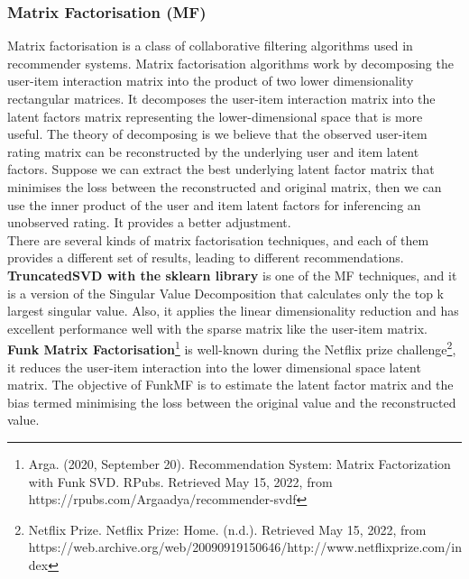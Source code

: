 \subsubsection{Matrix Factorisation (MF)}
\label{Matrix Factorisation}
Matrix factorisation is a class of collaborative filtering algorithms used in recommender systems. Matrix factorisation algorithms work by decomposing the user-item interaction matrix into the product of two lower dimensionality rectangular matrices. It decomposes the user-item interaction matrix into the latent factors matrix representing the lower-dimensional space that is more useful. The theory of decomposing is we believe that the observed user-item rating matrix can be reconstructed by the underlying user and item latent factors. Suppose we can extract the best underlying latent factor matrix that minimises the loss between the reconstructed and original matrix, then we can use the inner product of the user and item latent factors for inferencing an unobserved rating. It provides a better adjustment.
\\There are several kinds of matrix factorisation techniques, and each of them provides a different set of results, leading to different recommendations.
\\ \textbf{TruncatedSVD with the sklearn library} is one of the MF techniques, and it is a version of the Singular Value Decomposition that calculates only the top k largest singular value. Also, it applies the linear dimensionality reduction and has excellent performance well with the sparse matrix like the user-item matrix. 
\\\textbf{Funk Matrix Factorisation}\footnote{Arga. (2020, September 20). Recommendation System: Matrix Factorization with Funk SVD. RPubs. Retrieved May 15, 2022, from https://rpubs.com/Argaadya/recommender-svdf} is well-known during the Netflix prize challenge\footnote{Netflix Prize. Netflix Prize: Home. (n.d.). Retrieved May 15, 2022, from https://web.archive.org/web/20090919150646/http://www.netflixprize.com/index}, it reduces the user-item interaction into the lower dimensional space latent matrix. The objective of FunkMF is to estimate the latent factor matrix and the bias termed minimising the loss between the original value and the reconstructed value.

